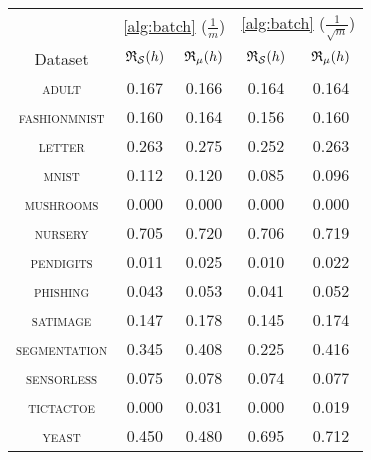 \begin{tabular}{c|cc|cc}
\toprule
 & \multicolumn{2}{c}{\cref{alg:batch} {\small ($\frac{1}{m}$)}} & \multicolumn{2}{c}{\cref{alg:batch} {\small ($\frac{1}{\sqrt{m}}$)}} \\
Dataset & {\scriptsize $\mathfrak{R}_{\mathcal{S}}(h)$} & {\scriptsize $\mathfrak{R}_{\mu}(h)$} & {\scriptsize $\mathfrak{R}_{\mathcal{S}}(h)$} & {\scriptsize $\mathfrak{R}_{\mu}(h)$} \\
\midrule
\textsc{\footnotesize adult} & 0.167 & 0.166 & 0.164 & 0.164 \\
\textsc{\footnotesize fashionmnist} & 0.160 & 0.164 & 0.156 & 0.160 \\
\textsc{\footnotesize letter} & 0.263 & 0.275 & 0.252 & 0.263 \\
\textsc{\footnotesize mnist} & 0.112 & 0.120 & 0.085 & 0.096 \\
\textsc{\footnotesize mushrooms} & 0.000 & 0.000 & 0.000 & 0.000 \\
\textsc{\footnotesize nursery} & 0.705 & 0.720 & 0.706 & 0.719 \\
\textsc{\footnotesize pendigits} & 0.011 & 0.025 & 0.010 & 0.022 \\
\textsc{\footnotesize phishing} & 0.043 & 0.053 & 0.041 & 0.052 \\
\textsc{\footnotesize satimage} & 0.147 & 0.178 & 0.145 & 0.174 \\
\textsc{\footnotesize segmentation} & 0.345 & 0.408 & 0.225 & 0.416 \\
\textsc{\footnotesize sensorless} & 0.075 & 0.078 & 0.074 & 0.077 \\
\textsc{\footnotesize tictactoe} & 0.000 & 0.031 & 0.000 & 0.019 \\
\textsc{\footnotesize yeast} & 0.450 & 0.480 & 0.695 & 0.712 \\
\bottomrule
\end{tabular}
